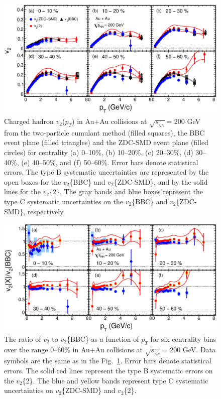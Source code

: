 \documentclass[aps,prc,superscriptaddress,showpacs,floatfix,twocolumn]{revtex4}
\newcommand \pt{\mbox{$p_T$}\xspace}
\newcommand \sqsn{\mbox{$\sqrt{s_{_{NN}}}$}\xspace}
\newcommand \Fig{Fig.\xspace}
\newcommand \Au{{Au+Au}\xspace}
\begin{document}
\begin{figure}[htb!]
\includegraphics[width=1.0\linewidth]{v2pt_zdc-smd_bbc_cumulant_cent0-60_twosubevents.eps}
\caption{\label{fig:v2pt_centdep_zdcsmd_bbc_twosubevents_wide} 
Charged hadron $v_2$(\pt) in \Au collisions at \sqsn = 200 GeV 
from the two-particle cumulant method (filled squares), the BBC 
event plane (filled triangles) and the ZDC-SMD event plane 
(filled circles) for centrality (a) 0--10\%, (b) 10--20\%, (c) 
20--30\%, (d) 30--40\%, (e) 40--50\%, and (f) 50--60\%. Error 
bars denote statistical errors. The type B systematic uncertainties 
are represented by the open boxes for the $v_2$\{BBC\} and 
$v_2$\{ZDC-SMD\}, and by the solid lines for the $v_2$\{2\}. The 
gray bands and blue boxes represent the type C systematic 
uncertainties on the $v_2$\{BBC\} and $v_2$\{ZDC-SMD\}, 
respectively.
}
\end{figure}

\begin{figure}[htb!]
\includegraphics[width=1.0\linewidth]{ratio_v2pt_zdc-smd_bbc_cumulant_cent0-60_twosubevents.eps}
\caption{\label{fig:ratio_v2pt_centdep_zdcsmd_bbc_twosubevents_wide}
The ratio of $v_2$ to $v_2$\{BBC\} as a function of \pt for six centrality bins over the 
range 0--60\% in \Au 
collisions at \sqsn = 200 GeV. Data symbols are the same as in the \Fig~\ref{fig:v2pt_centdep_zdcsmd_bbc_twosubevents_wide}.
Error bars denote statistical errors. The solid red lines represent the type B systematic errors on the 
$v_2$\{2\}. The blue and yellow bands represent type C systematic uncertainties 
on $v_2$\{ZDC-SMD\} and $v_2$\{2\}.
 }
\end{figure}
\end{document}
